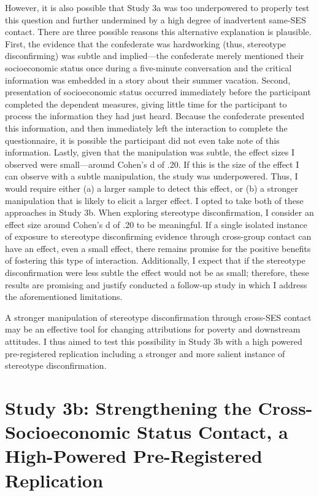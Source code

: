 \documentclass{sfuthesis}
\begin{document}
However, it is also possible that Study 3a was too underpowered to properly test this question and further undermined by a high degree of inadvertent same-SES contact. There are three possible reasons this alternative explanation is plausible. First, the evidence that the confederate was hardworking (thus, stereotype disconfirming) was subtle and implied—the confederate merely mentioned their socioeconomic status once during a five-minute conversation and the critical information was embedded in a story about their summer vacation. Second, presentation of socioeconomic status occurred immediately before the participant completed the dependent measures, giving little time for the participant to process the information they had just heard. Because the confederate presented this information, and then immediately left the interaction to complete the questionnaire, it is possible the participant did not even take note of this information. Lastly, given that the manipulation was subtle, the effect sizes I observed were small—around Cohen’s d of .20. If this is the size of the effect I can observe with a subtle manipulation, the study was underpowered. Thus, I would require either (a) a larger sample to detect this effect, or (b) a stronger manipulation that is likely to elicit a larger effect. I opted to take both of these approaches in Study 3b. When exploring stereotype disconfirmation, I consider an effect size around Cohen’s d of .20 to be meaningful. If a single isolated instance of exposure to stereotype disconfirming evidence through cross-group contact can have an effect, even a small effect, there remains promise for the positive benefits of fostering this type of interaction. Additionally, I expect that if the stereotype disconfirmation were less subtle the effect would not be as small; therefore, these results are promising and justify conducted a follow-up study in which I address the aforementioned limitations.

A stronger manipulation of stereotype disconfirmation through cross-SES contact may be an effective tool for changing attributions for poverty and downstream attitudes. I thus aimed to test this possibility in Study 3b with a high powered pre-registered replication including a stronger and more salient instance of stereotype disconfirmation.

\section{Study 3b: Strengthening the Cross-Socioeconomic Status Contact, a High-Powered Pre-Registered Replication}
\end{document}
